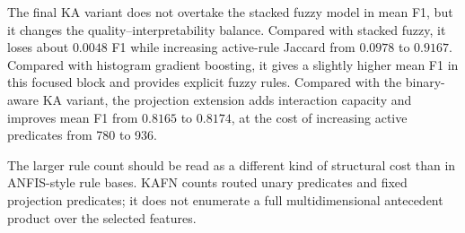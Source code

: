 \documentclass[runningheads]{llncs}
\begin{document}
\begin{table}[H]
\centering
\caption{Ablation path leading to the final Routed KAFN on \textit{covtype\_binary\_20000}.}
\label{tab:kafn_ablation}
\scriptsize
\setlength{\tabcolsep}{3pt}
\end{table}

The final KA variant does not overtake the stacked fuzzy model in mean F1, but it changes the quality--interpretability balance. Compared with stacked fuzzy, it loses about $0.0048$ F1 while increasing active-rule Jaccard from $0.0978$ to $0.9167$. Compared with histogram gradient boosting, it gives a slightly higher mean F1 in this focused block and provides explicit fuzzy rules. Compared with the binary-aware KA variant, the projection extension adds interaction capacity and improves mean F1 from $0.8165$ to $0.8174$, at the cost of increasing active predicates from 780 to 936.

The larger rule count should be read as a different kind of structural cost than in ANFIS-style rule bases. KAFN counts routed unary predicates and fixed projection predicates; it does not enumerate a full multidimensional antecedent product over the selected features.
\end{document}
